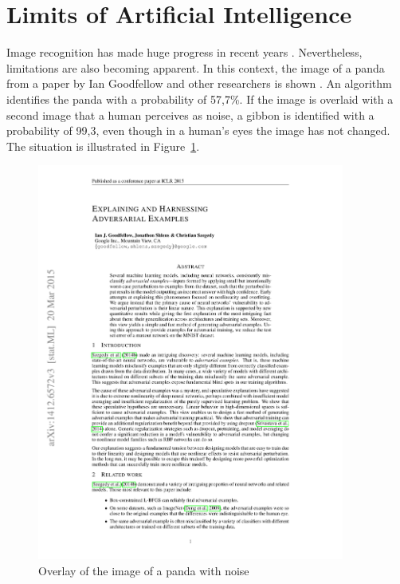 %
%


\section{Limits of Artificial Intelligence}

Image recognition has made huge progress in recent years \cite{}. Nevertheless, limitations are also becoming apparent. In this context, the image of a panda from a paper by Ian Goodfellow and other researchers is shown \cite{Goodfellow:2014}. An algorithm identifies the panda with a probability of 57{,}7\%. If the image is overlaid with a second image that a human perceives as noise, a gibbon is identified with a probability of 99{,}3, even though in a human's eyes the image has not changed. The situation is illustrated in Figure~\ref{Adversarial:Panda}.

\begin{figure}
    \includegraphics[page=3,width=0.9\textwidth,viewport=20 600 560 900,clip]{../../MLbib/Adversarial/1412.6572.pdf}
    
    \caption{Overlay of the image of a panda with noise
    	    \cite{Goodfellow:2014}}\label{Adversarial:Panda}
\end{figure}

